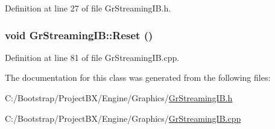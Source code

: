 Definition at line 27 of file GrStreamingIB.h.\hypertarget{class_gr_streaming_i_b_e5c7eb6fe055047ab7cba1720c15d67c}{
\subsubsection[{Reset}]{\setlength{\rightskip}{0pt plus 5cm}void GrStreamingIB::Reset ()}}
\label{class_gr_streaming_i_b_e5c7eb6fe055047ab7cba1720c15d67c}




Definition at line 81 of file GrStreamingIB.cpp.

The documentation for this class was generated from the following files:\begin{CompactItemize}
\item 
C:/Bootstrap/ProjectBX/Engine/Graphics/\hyperlink{_gr_streaming_i_b_8h}{GrStreamingIB.h}\item 
C:/Bootstrap/ProjectBX/Engine/Graphics/\hyperlink{_gr_streaming_i_b_8cpp}{GrStreamingIB.cpp}\end{CompactItemize}
